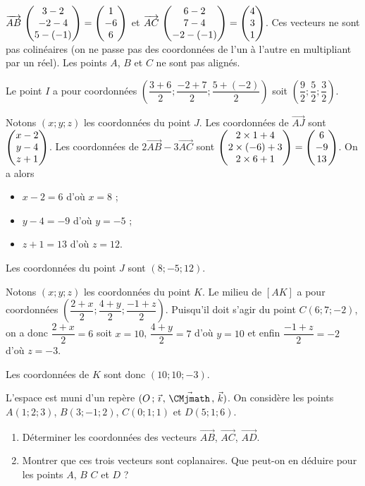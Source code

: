 \documentclass[11pt,fleqn, openany]{book} %
\begin{document}
\begin{solution}
$\coorde{AB}{3-2}{-2-4}{5-(-1)}=\coordbe{1}{-6}{6}$ et $\coorde{AC}{6-2}{7-4}{-2-(-1)}=\coordbe{4}{3}{1}$. Ces vecteurs ne sont pas colinéaires (on ne passe pas des coordonnées de l'un à l'autre en multipliant par un réel). Les points $A$, $B$ et $C$ ne sont pas alignés.

Le point $I$ a pour coordonnées $\left(\dfrac{3+6}{2} ; \dfrac{-2+7}{2}; \dfrac{5+(-2)}{2}\right)$ soit $\left(\dfrac{9}{2};\dfrac{5}{2};\dfrac{3}{2}\right)$.

Notons $(x;y;z)$ les coordonnées du point $J$. Les coordonnées de $\overrightarrow{AJ}$ sont $\coordbe{x-2}{y-4}{z+1}$. Les coordonnées de $2\overrightarrow{AB}-3\overrightarrow{AC}$ sont $\coordbe{2\times 1 + 4}{2\times (-6)+3}{2\times 6 + 1} = \coordbe{6}{-9}{13}$. On a alors

\begin{itemize}
\item $x-2=6$ d'où $x=8$ ;
\item $y-4=-9$ d'où $y=-5$ ;
\item $z+1=13$ d'où $z=12$.
\end{itemize}
Les coordonnées du point $J$ sont $(8;-5;12)$.

Notons $(x;y;z)$ les coordonnées du point $K$. Le milieu de $[AK]$ a pour coordonnées $\left( \dfrac{2+x}{2} ; \dfrac{4+y}{2} ; \dfrac{-1+z}{2}\right)$. Puisqu'il doit s'agir du point $C(6;7;-2)$, on a donc $\dfrac{2+x}{2}=6$ soit $x=10$, $\dfrac{4+y}{2}=7$ d'où  $y=10$ et enfin $\dfrac{-1+z}{2}=-2$ d'où $z=-3$.

Les coordonnées de $K$ sont donc $(10;10;-3)$.
\end{solution}



\begin{exercise}L'espace est muni d'un repère $\Oijk$. On considère les points $A(1;2;3)$, $B(3;-1;2)$, $C(0;1;1)$ et $D(5;1;6)$.
\begin{enumerate}
\item Déterminer les coordonnées des vecteurs $\overrightarrow{AB}$, $\overrightarrow{AC}$, $\overrightarrow{AD}$.
\item Montrer que ces trois vecteurs sont coplanaires. Que peut-on en déduire pour les points $A$, $B$ $C$ et $D$ ?
\end{enumerate}\end{exercise}
\end{document}
